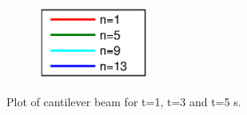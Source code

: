 \documentclass[]{report}
\begin{document}
\begin{figure}[ht!]
\begin{subfigure}[b]{0.5\textwidth}
\centering

\end{subfigure}\\
\\
\\
\begin{subfigure}[b]{1\textwidth}
\centering
\includegraphics[width=0.4\textwidth]{./Figures/cantilevertimeevolution_legend}
\end{subfigure}
\caption{Plot of cantilever beam for t=1, t=3 and t=5 s. }
\label{fig:cantilevertimeevolution}
\end{figure}


\end{document}
